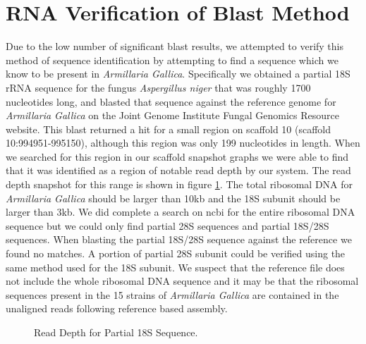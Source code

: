 \documentclass[12pt]{article}
\begin{document}
%
%
\vspace{-1cm}
\section{RNA Verification of Blast Method}
\vspace{-0.5cm}
	Due to the low number of significant blast results, we attempted to verify this method of sequence identification by attempting to find a sequence which we know to be present in \textit{Armillaria Gallica}. Specifically we obtained a partial 18S rRNA sequence for the fungus \textit{Aspergillus niger} that was roughly 1700 nucleotides long, and blasted that sequence against the reference genome for \textit{Armillaria Gallica} on the Joint Genome Institute Fungal Genomics Resource website. This blast returned a hit for a small region on scaffold 10 (scaffold 10:994951-995150), although this region was only 199 nucleotides in length. When we searched for this region in our scaffold snapshot graphs we were able to find that it was identified as a region of notable read depth by our system. The read depth snapshot for this range is shown in figure \ref{rdsnp18Srrna}. The total ribosomal DNA for \textit{Armillaria Gallica} should be larger than 10kb and the 18S subunit should be larger than 3kb. We did complete a search on ncbi for the entire ribosomal DNA sequence but we could only find partial 28S sequences and partial 18S/28S sequences. When blasting the partial 18S/28S sequence against the reference we found no matches. A portion of partial 28S subunit could be verified using the same method used for the 18S subunit. We suspect that the reference file does not include the whole ribosomal DNA sequence and it may be that the ribosomal sequences present in the 15 strains of \textit{Armillaria Gallica} are contained in the unaligned reads following reference based assembly. 
			\vspace{-.5cm}
      \begin{figure}[H]
	\begin{centering}
 		\begin{singlespace}
			\vspace{-0.5cm}
			\caption[Read Depth for Partial 18S Sequence.]{Read Depth for Partial 18S Sequence.}\label{rdsnp18Srrna}
		\end{singlespace}
	\end{centering}
\end{figure}
%
%
\vspace{-1.25cm}
\end{document}
